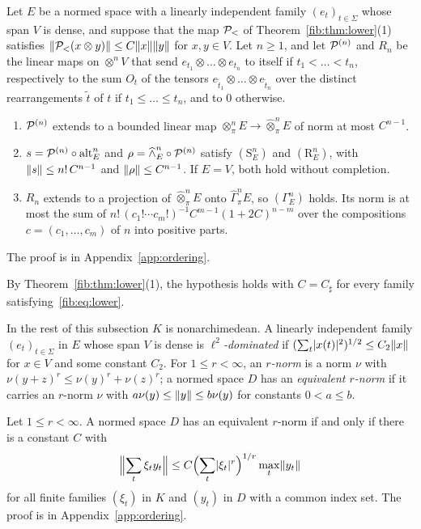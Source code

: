 \begin{proposition}\label{spl:prop:ordering}
Let $E$ be a normed space with a linearly independent family $(e_t)_{t\in\Sigma}$ whose span $V$ is dense, and suppose
that the map $\mathcal P_<$ of Theorem~\ref{fib:thm:lower}(1) satisfies $\lVert \mathcal P_<(x\otimes y)\rVert\le C\lVert x\rVert\lVert y\rVert$ for
$x,y\in V$. Let $n\ge1$, and let $\mathcal P^{(n)}$ and $R_n$ be the linear maps on $\otimes^nV$ that send
$e_{t_1}\otimes\dots\otimes e_{t_n}$ to itself if $t_1<\dots<t_n$, respectively to the sum $O_t$ of the tensors
$e_{\tilde t_1}\otimes\dots\otimes e_{\tilde t_n}$ over the distinct rearrangements $\tilde t$ of $t$ if $t_1\le\dots\le t_n$, and to $0$
otherwise.
\begin{enumerate}
\item $\mathcal P^{(n)}$ extends to a bounded linear map $\otimes^n_\pi E\to\widehat\otimes^n_\pi E$ of norm at most $C^{n-1}$.
\item $s=\mathcal P^{(n)}\circ\operatorname{alt}^n_E$ and $\rho=\widehat\wedge^n_E\circ\mathcal P^{(n)}$ satisfy $(\mathrm S^n_E)$ and
$(\mathrm R^n_E)$, with $\lVert s\rVert\le n!\,C^{n-1}$ and $\lVert \rho\rVert\le C^{n-1}$. If $E=V$, both hold without completion.
\item $R_n$ extends to a projection of $\widehat\otimes^n_\pi E$ onto $\widehat\Gamma^n_\pi E$, so $(\Gamma^n_E)$ holds.
Its norm is at most the sum of $n!\,(c_1!\cdots c_m!)^{-1}C^{m-1}(1+2C)^{n-m}$ over the compositions
$c=(c_1,\dots,c_m)$ of $n$ into positive parts.
\end{enumerate}
The proof is in Appendix~\ref{app:ordering}.
\end{proposition}

By Theorem~\ref{fib:thm:lower}(1), the hypothesis holds with $C=C_\sharp$ for every family satisfying~\eqref{fib:eq:lower}.

In the rest of this subsection $K$ is nonarchimedean. A linearly independent family $(e_t)_{t\in\Sigma}$ in $E$ whose span
$V$ is dense is \emph{$\ell^2$-dominated} if $(\sum_t\lvert x(t)\rvert^2)^{1/2}\le C_2\lVert x\rVert$ for $x\in V$ and some constant
$C_2$. For $1\le r<\infty$, an \emph{$r$-norm} is a norm $\nu$ with $\nu(y+z)^r\le\nu(y)^r+\nu(z)^r$; a normed space $D$ has an \emph{equivalent
$r$-norm} if it carries an $r$-norm $\nu$ with $a\nu(y)\le\lVert y\rVert\le b\nu(y)$ for constants $0<a\le b$.

\begin{proposition}[$r$-norms]\label{spl:prop:r-norm}
Let $1\le r<\infty$. A normed space $D$ has an equivalent $r$-norm if and only if there is a constant $C$ with
\begin{equation}\label{spl:eq:r-norm}
 \Bigl\lVert\sum_t\xi_ty_t\Bigr\rVert\le C\Bigl(\sum_t\lvert \xi_t\rvert^r\Bigr)^{1/r}\max_t\lVert y_t\rVert
\end{equation}
for all finite families $(\xi_t)$ in $K$ and $(y_t)$ in $D$ with a common index set. The proof is in
Appendix~\ref{app:ordering}.
\end{proposition}

